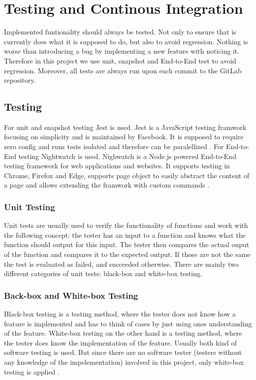 \chapter{Testing and Continous Integration}
\label{chapter:testingAndCI}

Implemented funtionality should always be tested. Not only to ensure that is currently does what it is supposed to do, but also to avoid regression. Nothing is worse than introducing a bug by implementing a new feature with noticing it. Therefore in this project we use unit, snapshot and End-to-End test to avoid regression.
Moreover, all tests are always run upon each commit to the GitLab repository.

\section{Testing}
\label{section:testing}
For unit and snapshot testing Jest is used. Jest is a JavaScript testing framwork focusing on simplicity and is maintained by Facebook. It is supposed to require zero config and runs tests isolated and therefore can be paralellized \cite{Jest}. For End-to-End testing Nightwatch is used. Nighwatch is a Node.js powered End-to-End testing framework for web applications and websites. It supports testing in Chrome, Firefox and Edge, supports page object to easily abstract the content of a page and allows extending the framwork with custom commands \cite{Nightwatch}.

\subsection{Unit Testing}
\label{subsection:unitTesting}
Unit tests are usually used to verify the functionality of functions and work with the following concept: the tester has an input to a function and knows what the function should output for this input. The tester then compares the actual ouput of the function and compares it to the expected output. If those are not the same the test is evaluated as failed, and succeeded otherwise.
There are mainly two different categories of unit tests: black-box and white-box testing.

\subsection*{Back-box and White-box Testing}
Black-box testing is a testing method, where the tester does not know how a feature is implemented and has to think of cases by just using ones understanding of the feature. White-box testing on the other hand is a testing method, where the tester does know the implementation of the feature. Usually both kind of software testing is used. But since there are no software tester  (testers without any knowledge of the impelementation) involved in this project, only white-box testing is applied \cite{BlackBoxWhiteBoxTesting}.

